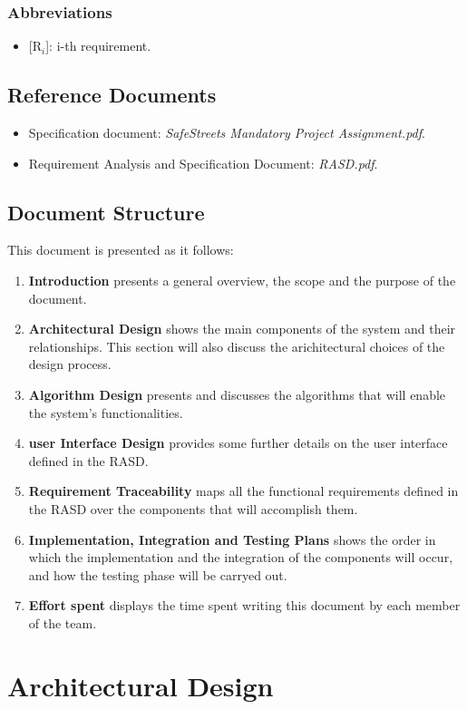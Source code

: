 \documentclass{report}
\begin{document}
\subsection{Abbreviations}
\begin{itemize}
    \item {[R$_{i}$]}: i-th requirement.
    \end{itemize}
\section{Reference Documents}
\begin{itemize}
    \item Specification document: \textit{SafeStreets Mandatory Project Assignment.pdf}.
    \item Requirement Analysis and Specification Document: \textit{RASD.pdf}.
\end{itemize}
\section{Document Structure}
This document is presented as it follows:
\begin{enumerate}
    \item \textbf{Introduction} presents a general overview, the scope and the purpose of the document.
    \item \textbf{Architectural Design} shows the main components of the system and their relationships. This section will also discuss the arichitectural choices of the design process.
    \item \textbf{Algorithm Design} presents and discusses the algorithms that will enable the system's functionalities.
    \item \textbf{user Interface Design} provides some further details on the user interface defined in the RASD.
    \item \textbf{Requirement Traceability} maps all the functional requirements defined in the RASD over the components that will accomplish them.
    \item \textbf{Implementation, Integration and Testing Plans} shows the order in which the implementation and the integration of the components will occur, and how the testing phase will be carryed out.
    \item {\textbf{Effort spent}} displays the time spent writing this document by each member of the team.
\end{enumerate}
\chapter{Architectural Design}
\end{document}
